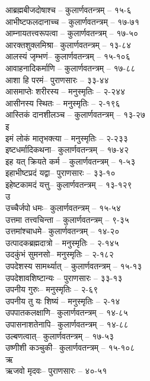 \begin{raggedright}
\begin{parcolumns}[colwidths={1=.55\textwidth,2=.55\textwidth}]{2}
{आब्रह्मबीजदोषाश्च	– 	कुलार्णवतन्त्रम्  – १५-६\\	
आभीष्टफलदानाच्च	– 	कुलार्णवतन्त्रम्  – १७-७१\\
आम्नायतत्त्वरूपत्वा	– 	कुलार्णवतन्त्रम्  – १७-५०\\
आरक्तशुक्लमिश्रा– 	कुलार्णवतन्त्रम्  – १३-८४\\
आलस्यं जृम्भणं– 	कुलार्णवतन्त्रम्  – १५-१०६\\
आवाहनादिकर्माणि	– 	कुलार्णवतन्त्रम्  – १७-८८\\
आशा हि परमं– 	पुराणसारः   – ३३-४४\\
आसमाप्तेः शरीरस्य	– 	मनुस्मृतिः  – २-२४४\\
आसीनस्य स्थितः	– 	मनुस्मृतिः  – २-१९६\\
आस्तिकं दानशीलञ्च	– 	कुलार्णवतन्त्रम्  – १३-२७\\
{\large इ}\\
इमं लोकं मातृभक्त्या	– 	मनुस्मृतिः  – २-२३३\\
इष्टधर्मादिकथना– 	 कुलार्णवतन्त्रम्  – १७-४२\\
इह यत् क्रियते कर्म	– 	कुलार्णवतन्त्रम्  – १-५३\\
इहाभीष्टप्रदं यद्वा– 	पुराणसारः   – ३३-१०\\
इहेष्टकामदं यत्तु– 	कुलार्णवतन्त्रम्  – १३-१२९\\
{\large उ}\\
उच्चैर्जपोधमः– 	कुलार्णवतन्त्रम्  – १५-५४\\
उत्तमा तत्त्वचिन्ता	– 	कुलार्णवतन्त्रम्  – ९-३५\\
उत्तमांश्चाधमे– 	कुलार्णवतन्त्रम्  – १४-२०\\
उत्पादकब्रह्मदात्रो – 	मनुस्मृतिः  – 	२-१४५\\
उदकुंभं सुमनसो– 	मनुस्मृतिः  – २-१८२\\
उपदेशस्य सामर्थ्यात्	– 	कुलार्णवतन्त्रम्  – १५-१३\\
उपदेशावशिष्टान्यः	– 	पुराणसारः   – ३३-१३\\
उपनीय गुरुः– 	मनुस्मृतिः  – २-६९ \\
उपनीय तु यः शिष्यं	– मनुस्मृतिः  – २-१४\\
उपपातकलक्षाणि– 	कुलार्णवतन्त्रम्  – १४-८५\\
उपासनाशतेनापि– 	कुलार्णवतन्त्रम्  – १४-८८\\
उल्बणत्वात्– 	 कुलार्णवतन्त्रम्  – १७-५३\\
उष्णीशी कञ्चुकी– 	कुलार्णवतन्त्रम्  – १५-१०८\\
{\large ऋ}\\
ऋजवो मृदवः– 	पुराणसारः   – ४०-५१\\
}
\end{parcolumns}
\end{raggedright}

